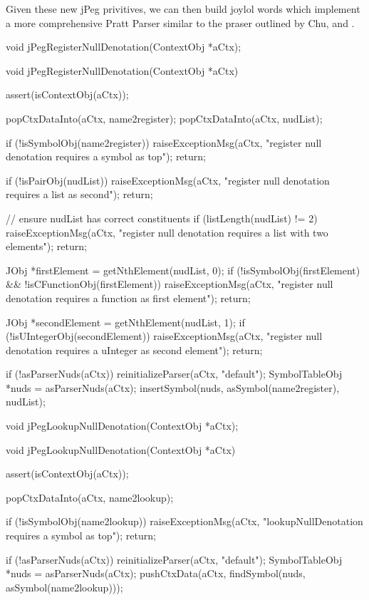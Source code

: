 Given these new jPeg privitives, we can then build joylol words which 
implement a more comprehensive Pratt Parser similar to the praser outlined 
by Chu, \cite{chu2016prattParsing} and \cite{chu2016prattParsingGitHub}. 


\startCHeader
void jPegRegisterNullDenotation(ContextObj *aCtx);
\stopCHeader

\startCCode
void jPegRegisterNullDenotation(ContextObj *aCtx) {
  assert(isContextObj(aCtx));

  popCtxDataInto(aCtx, name2register);
  popCtxDataInto(aCtx, nudList);

  if (!isSymbolObj(name2register)) {
    raiseExceptionMsg(aCtx,
      "register null denotation requires a symbol as top");
    return;
  }

  if (!isPairObj(nudList)) {
    raiseExceptionMsg(aCtx,
      "register null denotation requires a list as second");
    return;
  }

  // ensure nudList has correct constituents
  if (listLength(nudList) != 2) {
    raiseExceptionMsg(aCtx,
      "register null denotation requires a list with two elements");
    return;    
  }
  
  JObj *firstElement = getNthElement(nudList, 0);
  if (!isSymbolObj(firstElement) && !isCFunctionObj(firstElement)) {
    raiseExceptionMsg(aCtx,
      "register null denotation requires a function as first element");
    return;    
  }

  JObj *secondElement = getNthElement(nudList, 1);
  if (!isUIntegerObj(secondElement)) {
    raiseExceptionMsg(aCtx,
      "register null denotation requires a uInteger as second element");
    return;    
  }

  if (!asParserNuds(aCtx)) reinitializeParser(aCtx, "default");
  SymbolTableObj *nuds = asParserNuds(aCtx);
  insertSymbol(nuds, asSymbol(name2register), nudList);
}
\stopCCode

\startCHeader
void jPegLookupNullDenotation(ContextObj *aCtx);
\stopCHeader

\startCCode
void jPegLookupNullDenotation(ContextObj *aCtx) {
  assert(isContextObj(aCtx));

  popCtxDataInto(aCtx, name2lookup);

  if (!isSymbolObj(name2lookup)) {
    raiseExceptionMsg(aCtx,
      "lookupNullDenotation requires a symbol as top");
    return;
  }

  if (!asParserNuds(aCtx)) reinitializeParser(aCtx, "default");
  SymbolTableObj *nuds = asParserNuds(aCtx);
  pushCtxData(aCtx, findSymbol(nuds, asSymbol(name2lookup)));
}
\stopCCode

